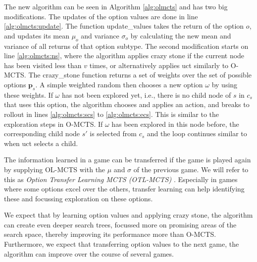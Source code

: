 The new algorithm can be seen in Algorithm \ref{alg:olmcts} and has two big
modifications. The updates of the option values are done in line
\ref{alg:olmcts:update}. The function \textsf{update\_values} takes the return
of the option $o$, and updates its mean $\mu_o$ and variance $\sigma_o$ by
calculating the new mean and variance of all returns of that option subtype. The
second modification starts on line \ref{alg:olmcts:ns}, where the algorithm
applies crazy stone if the current node has been visited less than $v$ times, or
alternatively applies \textsf{uct} similarly to O-MCTS. The
\textsf{crazy\_stone} function returns a set of weights over the set of possible
options $\mathbf{p}_s$. A simple weighted random then chooses a new option
$\omega$ by using these weights.  If $\omega$ has not been explored yet, i.e.,
there is no child node of $s$ in $c_s$ that uses this option, the algorithm
chooses and applies an action, and breaks to rollout in lines
\ref{alg:olmcts:scs} to \ref{alg:olmcts:ecs}. This is similar to the exploration
steps in O-MCTS. If $\omega$ has been explored in this node before, the
corresponding child node $s'$ is selected from $c_s$ and the loop continues
similar to when \textsf{uct} selects a child.

The information learned in a game can be transferred if the game is played
again by supplying OL-MCTS with the $\mu$ and $\sigma$ of the previous game. We
will refer to this as \emph{Option Transfer Learning MCTS (OTL-MCTS)} . Especially
in games where some options excel over the others, transfer learning can help
identifying these and focussing exploration on these options. 

We expect that by learning option values and applying crazy stone, the algorithm
can create even deeper search trees, focussed more on promising areas of the
search space, thereby improving its performance more than O-MCTS. Furthermore,
we expect that transferring option values to the next game, the algorithm can
improve over the course of several games.
